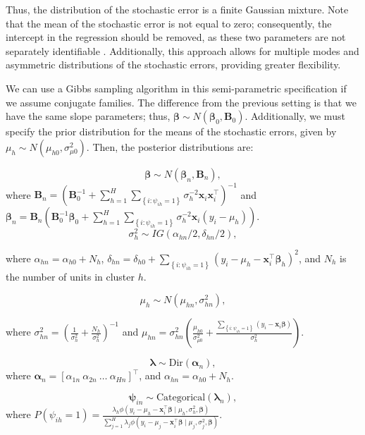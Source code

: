 Thus, the distribution of the stochastic error is a finite Gaussian mixture. Note that the mean of the stochastic error is not equal to zero; consequently, the intercept in the regression should be removed, as these two parameters are not separately identifiable \cite{van2011bayesian}. Additionally, this approach allows for multiple modes and asymmetric distributions of the stochastic errors, providing greater flexibility.

We can use a Gibbs sampling algorithm in this semi-parametric specification if we assume conjugate families. The difference from the previous setting is that we have the same slope parameters; thus, $\boldsymbol{\beta} \sim N(\boldsymbol{\beta}_{0},\boldsymbol{B}_{0})$. Additionally, we must specify the prior distribution for the means of the stochastic errors, given by $\mu_h \sim N(\mu_{h0},\sigma^2_{\mu 0})$. Then, the posterior distributions are:

$$\boldsymbol{\beta}\sim N(\boldsymbol{\beta}_{n},\boldsymbol{B}_{n}),$$ where $\boldsymbol{B}_{n}=(\boldsymbol{B}_{0}^{-1}+\sum_{h=1}^H\sum_{\left\{i:  \psi_{ih}=1\right\}}\sigma_h^{-2}\boldsymbol{x}_i\boldsymbol{x}_i^{\top})^{-1}$ and $\boldsymbol{\beta}_{n}=\boldsymbol{B}_{n}(\boldsymbol{B}_{0}^{-1}\boldsymbol{\beta}_{0}+\sum_{h=1}^H\sum_{\left\{i:  \psi_{ih}=1\right\}}\sigma_h^{-2}\boldsymbol{x}_i(y_i-\mu_h))$.
$$\sigma_h^2\sim IG(\alpha_{hn}/2,\delta_{hn}/2),$$

where $\alpha_{hn}=\alpha_{h0}+N_h$, $\delta_{hn}=\delta_{h0}+\sum_{\left\{i:  \psi_{ih}=1\right\}}(y_i-\mu_h-\boldsymbol{x}_i^{\top}\boldsymbol{\beta}_h)^2$, and $N_h$ is the number of units in cluster $h$.

$$\mu_h\sim N(\mu_{hn},\sigma_{hn}^2),$$

where $\sigma_{hn}^2=\left(\frac{1}{\sigma_{h}^{2}}+\frac{N_h}{\sigma_{h}^2}\right)^{-1}$ and $\mu_{hn}=\sigma_{hn}^2\left(\frac{\mu_{h0}}{\sigma_{\mu0}^2}+\frac{\sum_{\left\{i:\psi_{ih}=1\right\}} (y_i-\boldsymbol{x}_i\boldsymbol{\beta})}{\sigma_h^2}\right)$.

$$\boldsymbol{\lambda}\sim \text{Dir}(\boldsymbol{\alpha}_n),$$   
where $\boldsymbol{\alpha}_n=[\alpha_{1n} \  \alpha_{2n} \ \dots \ \alpha_{Hn}]^{\top}$, and $\alpha_{hn}=\alpha_{h0}+N_h$.

$$\boldsymbol{\psi}_{in}\sim \text{Categorical}(\boldsymbol{\lambda}_n),$$
where $P(\psi_{ih}=1)=\frac{\lambda_{h}\phi(y_i-\mu_h-\boldsymbol{x}_i^{\top}\boldsymbol{\beta} \mid \mu_h,\sigma_h^2,\boldsymbol{\beta})}{\sum_{j=1}^H\lambda_{j}\phi(y_i-\mu_j-\boldsymbol{x}_i^{\top}\boldsymbol{\beta} \mid \mu_j,\sigma_j^2,\boldsymbol{\beta})}$.
 
